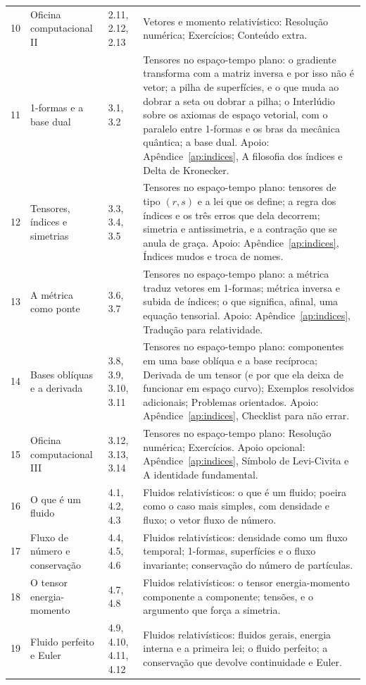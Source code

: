 \documentclass[12pt,a4paper,oneside]{book}
\theoremstyle{rgplain}
\theoremstyle{rgremark}
\begin{document}
\begin{longtable}{cp{3.3cm}p{2.3cm}p{6.1cm}}
10 & Oficina computacional II & 2.11, 2.12, 2.13 & Vetores e momento relativístico: Resolução numérica; Exercícios; Conteúdo extra. \\
11 & 1-formas e a base dual & 3.1, 3.2 & Tensores no espaço-tempo plano: o gradiente transforma com a matriz inversa e por isso não é vetor; a pilha de superfícies, e o que muda ao dobrar a seta ou dobrar a pilha; o Interlúdio sobre os axiomas de espaço vetorial, com o paralelo entre 1-formas e os bras da mecânica quântica; a base dual. Apoio: Apêndice~\ref{ap:indices}, A filosofia dos índices e Delta de Kronecker. \\
12 & Tensores, índices e simetrias & 3.3, 3.4, 3.5 & Tensores no espaço-tempo plano: tensores de tipo $(r,s)$ e a lei que os define; a regra dos índices e os três erros que dela decorrem; simetria e antissimetria, e a contração que se anula de graça. Apoio: Apêndice~\ref{ap:indices}, Índices mudos e troca de nomes. \\
13 & A métrica como ponte & 3.6, 3.7 & Tensores no espaço-tempo plano: a métrica traduz vetores em 1-formas; métrica inversa e subida de índices; o que significa, afinal, uma equação tensorial. Apoio: Apêndice~\ref{ap:indices}, Tradução para relatividade. \\
14 & Bases oblíquas e a derivada & 3.8, 3.9, 3.10, 3.11 & Tensores no espaço-tempo plano: componentes em uma base oblíqua e a base recíproca; Derivada de um tensor (e por que ela deixa de funcionar em espaço curvo); Exemplos resolvidos adicionais; Problemas orientados. Apoio: Apêndice~\ref{ap:indices}, Checklist para não errar. \\
15 & Oficina computacional III & 3.12, 3.13, 3.14 & Tensores no espaço-tempo plano: Resolução numérica; Exercícios. Apoio opcional: Apêndice~\ref{ap:indices}, Símbolo de Levi-Civita e A identidade fundamental. \\
16 & O que é um fluido & 4.1, 4.2, 4.3 & Fluidos relativísticos: o que é um fluido; poeira como o caso mais simples, com densidade e fluxo; o vetor fluxo de número. \\
17 & Fluxo de número e conservação & 4.4, 4.5, 4.6 & Fluidos relativísticos: densidade como um fluxo temporal; 1-formas, superfícies e o fluxo invariante; conservação do número de partículas. \\
18 & O tensor energia-momento & 4.7, 4.8 & Fluidos relativísticos: o tensor energia-momento componente a componente; tensões, e o argumento que força a simetria. \\
19 & Fluido perfeito e Euler & 4.9, 4.10, 4.11, 4.12 & Fluidos relativísticos: fluidos gerais, energia interna e a primeira lei; o fluido perfeito; a conservação que devolve continuidade e Euler. \\

\end{longtable}
\end{document}
